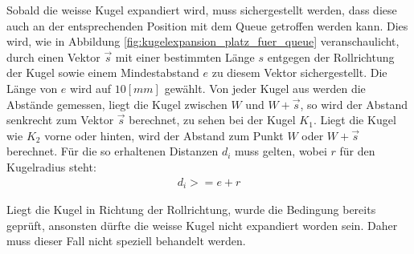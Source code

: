 

Sobald die weisse Kugel expandiert wird, muss sichergestellt werden, dass diese auch an der entsprechenden Position
mit dem Queue getroffen werden kann.
Dies wird, wie in Abbildung \ref{fig:kugelexpansion_platz_fuer_queue} veranschaulicht,
durch einen Vektor $\vec{s}$ mit einer bestimmten Länge $s$ entgegen der Rollrichtung der Kugel sowie einem Mindestabstand
$e$ zu diesem Vektor sichergestellt. Die Länge von $e$ wird auf $10 [mm]$ gewählt. Von jeder Kugel aus
werden die Abstände gemessen, liegt die Kugel zwischen $W$ und $W + \vec{s}$, so wird der Abstand senkrecht zum Vektor $\vec{s}$
berechnet, zu sehen bei der Kugel $K_1$. Liegt die Kugel wie $K_2$ vorne oder hinten, wird der Abstand zum Punkt $W$ oder $W + \vec{s}$
berechnet. Für die so erhaltenen Distanzen $d_i$ muss gelten, wobei $r$ für den Kugelradius steht:
\begin{align}
    d_i >= e + r
\end{align}

Liegt die Kugel in Richtung der Rollrichtung, wurde die Bedingung bereits geprüft, ansonsten dürfte die weisse Kugel nicht
expandiert worden sein. Daher muss dieser Fall nicht speziell behandelt werden.

